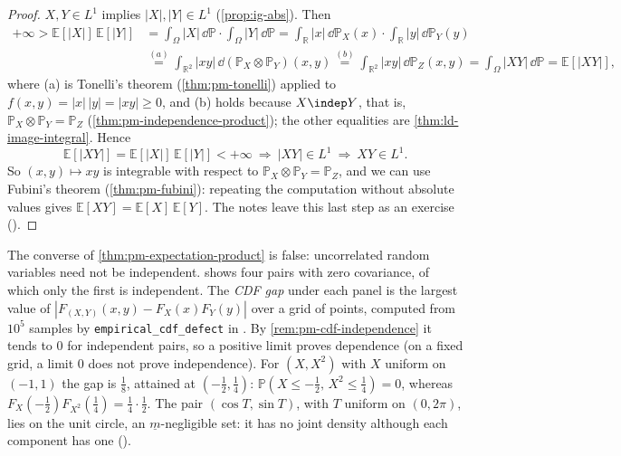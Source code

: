 \begin{proof}
$X,Y\in L^1$ implies $|X|,|Y|\in L^1$ (\cref{prop:ig-abs}). Then
\[
\begin{aligned}
  +\infty>\mathbb E[|X|]\,\mathbb E[|Y|]
  &=\int_\Omega|X|\,\dd\mathbb P\cdot\int_\Omega|Y|\,\dd\mathbb P
   =\int_{\mathbb R}|x|\,\dd\mathbb P_X(x)\cdot\int_{\mathbb R}|y|\,\dd\mathbb P_Y(y)\\
  &\overset{(a)}{=}\int_{\mathbb R^2}|xy|\,\dd(\mathbb P_X\otimes\mathbb P_Y)(x,y)
   \overset{(b)}{=}\int_{\mathbb R^2}|xy|\,\dd\mathbb P_Z(x,y)
   =\int_\Omega|XY|\,\dd\mathbb P=\mathbb E[|XY|],
\end{aligned}
\]
where (a) is Tonelli's theorem (\cref{thm:pm-tonelli}) applied to
$f(x,y)=|x|\,|y|=|xy|\ge0$, and (b) holds because $X\indep Y$, that is,
$\mathbb P_X\otimes\mathbb P_Y=\mathbb P_Z$ (\cref{thm:pm-independence-product}); the other
equalities are \cref{thm:ld-image-integral}. Hence
\[
  \mathbb E[|XY|]=\mathbb E[|X|]\,\mathbb E[|Y|]<+\infty\ \Longrightarrow\ |XY|\in L^1
  \ \Longrightarrow\ XY\in L^1 .
\]
So $(x,y)\mapsto xy$ is integrable with respect to $\mathbb P_X\otimes\mathbb P_Y=\mathbb P_Z$,
and we can use Fubini's theorem (\cref{thm:pm-fubini}): repeating the computation without
absolute values gives $\mathbb E[XY]=\mathbb E[X]\,\mathbb E[Y]$. The notes leave this last step
as an exercise ().
\end{proof}

\begin{remark}[computational]\label{rem:pm-code-uncorrelated}
The converse of \cref{thm:pm-expectation-product} is false: uncorrelated random variables need
not be independent.  shows four pairs with zero covariance, of which
only the first is independent. The \emph{CDF gap} under each panel is the largest value of
$|F_{(X,Y)}(x,y)-F_X(x)F_Y(y)|$ over a grid of points, computed from $10^5$ samples by
\texttt{empirical\_cdf\_defect} in . By
\cref{rem:pm-cdf-independence} it tends to $0$ for independent pairs, so a positive limit
proves dependence (on a fixed grid, a limit $0$ does not prove independence). For
$(X,X^2)$ with $X$ uniform on $(-1,1)$ the gap is $\frac18$, attained at $(-\frac12,\frac14)$:
$\mathbb P(X\le-\frac12,\,X^2\le\frac14)=0$, whereas $F_X(-\frac12)F_{X^2}(\frac14)=\frac14\cdot\frac12$.
The pair $(\cos T,\sin T)$, with $T$ uniform on $(0,2\pi)$, lies on the unit circle, an
$\underline m$-negligible set: it has no joint density although each component has one
().
\end{remark}

